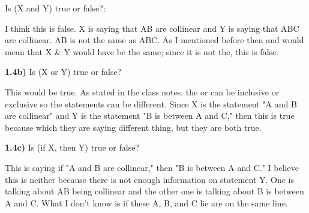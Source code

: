 \documentclass{article}
\begin{document}
\begin{center}
\end{center}




\begin{center}
\end{center}



Is (X and Y) true or false?:
\vspace{3mm}

I think this is false. X is saying that AB are collinear and Y is saying that ABC are collinear. AB is not the same as ABC. As I mentioned before then and would mean that X \& Y would have be the same; since it is not the, this is false. 

\vspace{1in}


\textbf{1.4b)} Is (X or Y) true or false?

\vspace{3mm}

This would be true. As stated in the class notes, the or can be inclusive or exclusive so the statements can be different. 
Since X is the statement "A and B are collinear" and Y is the statement "B is between A and C," then this is true because which they are saying different thing, but they are both true.


\newpage 

\textbf{1.4c)} Is (if X, then Y) true or false?

\vspace{3mm}

This is saying if "A and B are collinear," then "B is between A and C." I believe this is neither because there is not enough information on statement Y. One is talking about AB being collinear and the other one is talking about B is between A and C. What I don't know is if these  A, B, and C lie are on the same line. 
\end{document}
